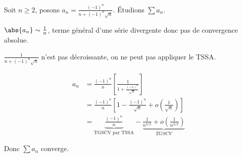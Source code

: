 \begin{exemple}
    Soit $n \geqslant 2$, posons $\displaystyle a_n = \frac{(-1)^n}{n + (-1)^n\sqrt{n}}$.
    Étudions $\sum a_n$.

    $\abs{a_n} \sim \frac 1 n$, terme général d'une série divergente donc pas de convergence absolue. 

    $\displaystyle \frac 1 {n + (-1)^n \sqrt n}$ n'est pas décroissante, on ne peut pas appliquer le TSSA. 

    \begin{align*}
        a_n & = \frac{(-1)^n} n \left[ \frac 1 {1 + \frac{(-1)^n} {\sqrt n}} \right] \\
            & = \frac{(-1)^n} n \left[ 1 - \frac{(-1)^n}{\sqrt n} + o\left( \frac 1 {\sqrt n} \right) \right] \\
            & = \underbrace{\frac{(-1)^n} n}_{\text{TGSCV par TSSA}} - \underbrace{\frac 1 {n^{3/2}} + o\left( \frac 1 {n^{3/2}} \right)}_{TGSCV}
    \end{align*}
    
    Donc $\sum a_n$ converge.
\end{exemple}

